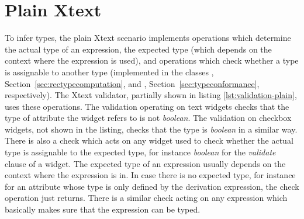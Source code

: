 \section{Plain Xtext}
\label{sec:plain-xtext}

To infer types, the plain Xtext scenario implements operations which determine
the actual type of an expression, the expected type (which depends on the
context where the expression is used), and operations which check whether a type
is assignable to another type (implemented in the classes
, Section~\ref{sec:rectypecomputation}, and
, Section~\ref{sec:typeconformance}, respectively). The
Xtext validator, partially shown in listing \ref{lst:validation-plain}, uses
these operations.  The validation operating on text widgets checks that the type
of attribute the widget refers to is not \emph{boolean}.  The validation on
checkbox widgets, not shown in the listing, checks that the type is
\emph{boolean} in a similar way.
There is also a check which acts on any widget used to check whether the actual
type is assignable to the expected type, for instance \emph{boolean} for the
\emph{validate} clause of a widget. The expected type of an expression usually
depends on the context where the expression is in.
In case there is no expected type, for instance for an attribute whose type is
only defined by the derivation expression, the check operation just returns.
There is a similar check acting on any expression which basically makes sure
that the expression can be typed.

%


